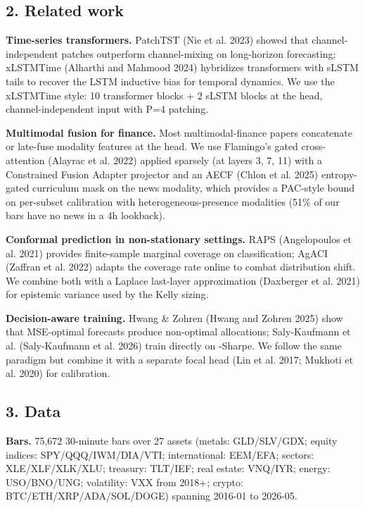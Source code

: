 \documentclass[
]{article}
\begin{document}
\subsection{2. Related work}\label{related-work}

\textbf{Time-series transformers.} PatchTST (Nie et al. 2023) showed
that channel-independent patches outperform channel-mixing on
long-horizon forecasting; xLSTMTime (Alharthi and Mahmood 2024)
hybridizes transformers with sLSTM tails to recover the LSTM inductive
bias for temporal dynamics. We use the xLSTMTime style: 10 transformer
blocks + 2 sLSTM blocks at the head, channel-independent input with P=4
patching.

\textbf{Multimodal fusion for finance.} Most multimodal-finance papers
concatenate or late-fuse modality features at the head. We use
Flamingo's gated cross-attention ({Alayrac et al.} 2022) applied
sparsely (at layers 3, 7, 11) with a Constrained Fusion Adapter
projector and an AECF ({Chlon et al.} 2025) entropy-gated curriculum
mask on the news modality, which provides a PAC-style bound on
per-subset calibration with heterogeneous-presence modalities (51\% of
our bars have no news in a 4h lookback).

\textbf{Conformal prediction in non-stationary settings.} RAPS
(Angelopoulos et al. 2021) provides finite-sample marginal coverage on
classification; AgACI (Zaffran et al. 2022) adapts the coverage rate
online to combat distribution shift. We combine both with a Laplace
last-layer approximation (Daxberger et al. 2021) for epistemic variance
used by the Kelly sizing.

\textbf{Decision-aware training.} Hwang \& Zohren (Hwang and Zohren
2025) show that MSE-optimal forecasts produce non-optimal allocations;
Saly-Kaufmann et al. (Saly-Kaufmann et al. 2026) train directly on
-Sharpe. We follow the same paradigm but combine it with a separate
focal head (Lin et al. 2017; Mukhoti et al. 2020) for calibration.

\subsection{3. Data}\label{data}

\textbf{Bars.} 75,672 30-minute bars over 27 assets (metals:
GLD/SLV/GDX; equity indices: SPY/QQQ/IWM/DIA/VTI; international:
EEM/EFA; sectors: XLE/XLF/XLK/XLU; treasury: TLT/IEF; real estate:
VNQ/IYR; energy: USO/BNO/UNG; volatility: VXX from 2018+; crypto:
BTC/ETH/XRP/ADA/SOL/DOGE) spanning 2016-01 to 2026-05.
\end{document}
